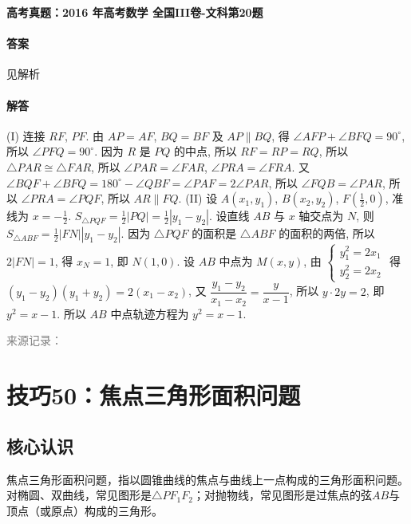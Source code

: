 \documentclass[UTF8,a4paper,11pt]{ctexart}
\newenvironment{gaokao}[1]{\par\medskip\noindent\textbf{高考真题：#1}\par\smallskip}{\par\medskip}
\begin{document}
\begin{gaokao}{2016 年高考数学 全国III卷-文科第20题}
\paragraph{答案}

见解析

\paragraph{解答}

(I) 连接 $RF$, $PF$. 由 $AP=AF$, $BQ=BF$ 及 $AP\parallel BQ$, 得 $\angle AFP+\angle BFQ=90^{\circ}$, 所以 $\angle PFQ=90^{\circ}$. 因为 $R$ 是 $PQ$ 的中点, 所以 $RF=RP=RQ$, 所以 $\triangle PAR\cong\triangle FAR$, 所以 $\angle PAR=\angle FAR$, $\angle PRA=\angle FRA$. 又 $\angle BQF+\angle BFQ=180^{\circ}-\angle QBF=\angle PAF=2\angle PAR$, 所以 $\angle FQB=\angle PAR$, 所以 $\angle PRA=\angle PQF$, 所以 $AR\parallel FQ$.
(II) 设 $A(x_1,y_1)$, $B(x_2,y_2)$, $F(\frac{1}{2},0)$, 准线为 $x=-\frac{1}{2}$. $S_{\triangle PQF}=\frac{1}{2}|PQ|=\frac{1}{2}|y_1-y_2|$. 设直线 $AB$ 与 $x$ 轴交点为 $N$, 则 $S_{\triangle ABF}=\frac{1}{2}|FN||y_1-y_2|$. 因为 $\triangle PQF$ 的面积是 $\triangle ABF$ 的面积的两倍, 所以 $2|FN|=1$, 得 $x_N=1$, 即 $N(1,0)$. 设 $AB$ 中点为 $M(x,y)$, 由 $\begin{cases}y_1^2=2x_1\\ y_2^2=2x_2\end{cases}$ 得 $(y_1-y_2)(y_1+y_2)=2(x_1-x_2)$, 又 $\dfrac{y_1-y_2}{x_1-x_2}=\dfrac{y}{x-1}$, 所以 $y\cdot2y=2$, 即 $y^2=x-1$. 所以 $AB$ 中点轨迹方程为 $y^2=x-1$.

\par\smallskip\textcolor{gray}{\footnotesize 来源记录：\texttt{}}

\end{gaokao}

\clearpage

\section{技巧50：焦点三角形面积问题}

\subsection*{核心认识}

焦点三角形面积问题，指以圆锥曲线的焦点与曲线上一点构成的三角形面积问题。对椭圆、双曲线，常见图形是$\triangle PF_1F_2$；对抛物线，常见图形是过焦点的弦$AB$与顶点（或原点）构成的三角形。
\end{document}

